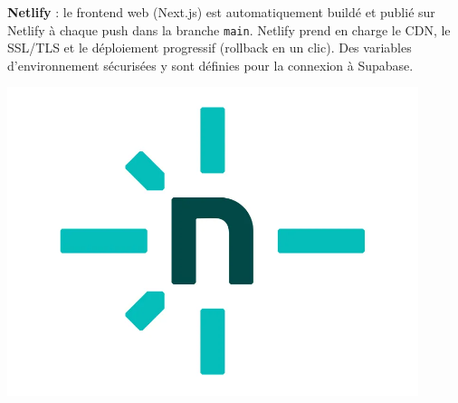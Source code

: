 \begin{minipage}{0.7\textwidth}
\textbf{Netlify} : le frontend web (Next.js) est automatiquement buildé et publié sur Netlify à chaque push dans la branche \texttt{main}. Netlify prend en charge le CDN, le SSL/TLS et le déploiement progressif (rollback en un clic). Des variables d’environnement sécurisées y sont définies pour la connexion à Supabase.
\end{minipage}%
\hfill
\begin{minipage}{0.25\textwidth}
\centering
\includegraphics[width=0.9\textwidth]{assets/docs/logo_netlify.png}
\end{minipage}

\vspace{0.5cm}

